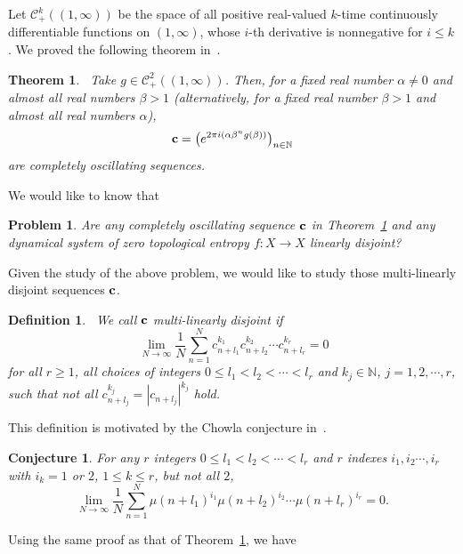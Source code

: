 \documentclass[12pt,letterpaper]{amsart}
\newtheorem {definition}{Definition}
\newtheorem {problem}{Problem}
\newtheorem {conjecture}{Conjecture}
\newtheorem{thmx}{Theorem}
\newcommand {\N} {{\mathbb N}}
\begin{document}
Let $\mathcal{C}^{k}_{+}((1,\infty))$ be the space of all positive real-valued $k$-time continuously differentiable
functions on $(1,\infty)$, whose $i$-th derivative is nonnegative for $i\le k$. We proved the following theorem in~\cite{AJ}.  

\medskip
\begin{thmx}~\label{ajthm}
Take $g\in \mathcal{C}^{2}_{+}((1,\infty))$. Then, for a fixed real
number $\alpha\not=0$ and almost all real numbers $\beta>1$ 
(alternatively, for a fixed real number $\beta>1$ and almost all real numbers $\alpha$),
$$
{\bf c} =\big( e^{2\pi i (\alpha \beta^{n}g(\beta))}\big)_{n\in \N}
$$
are completely oscillating sequences.
\end{thmx}

\medskip
We would like to know that 

\medskip
\begin{problem}  
Are any completely oscillating sequence ${\bf c}$ in Theorem~\ref{ajthm} and any dynamical system of zero topological entropy $f: X\to X$ linearly disjoint?
\end{problem}

Given the study of the above problem, we would like to study those multi-linearly disjoint sequences ${\bf c}$.
 
\medskip
\begin{definition}~\label{cs}
We call ${\bf c}$ multi-linearly disjoint if 
\begin{equation}~\label{cse}
\lim_{N\to \infty} \frac{1}{N} \sum_{n=1}^{N} c_{n+l_{1}}^{k_{1}} c_{n+l_{2}}^{k_{2}} \cdots c_{n+l_{r}}^{k_{r}} =0
\end{equation} 
for all $r\geq 1$, all choices of integers $0\leq l_{1} <l_{2}< \cdots <l_{r}$ and $k_{j}\in \N$, $j=1, 2, \cdots, r$, such that not all $c_{n+l_{j}}^{k_{j}} =|c_{n+l_{j}}|^{k_{j}}$ hold.
\end{definition}

\medskip
This definition is motivated by the Chowla conjecture in~\cite{C}.

\medskip
\begin{conjecture}
For any $r$ integers $0\leq l_{1}<l_{2}<\cdots <l_{r}$ and $r$ indexes $i_{1},i_{2}\cdots, i_{r}$ with $i_{k}=1$ or $2$, $1\leq k\leq r$,  but not all $2$, 
$$
\lim_{N\to \infty} \frac{1}{N}\sum_{n=1}^{N} \mu (n+l_{1})^{i_{1}} \mu(n+l_{2})^{i_{2}}\cdots \mu (n+l_{r})^{i_{r}}=0.
$$
\end{conjecture}

Using the same proof as that of Theorem~\ref{ajthm}, we have 
\end{document}
